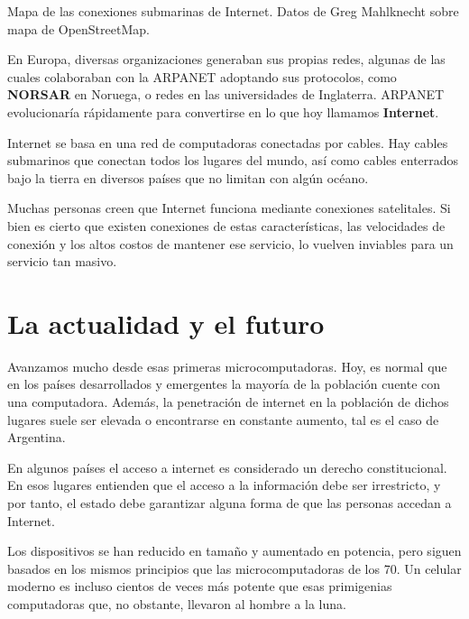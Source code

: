 {Mapa de las conexiones submarinas de Internet.} {Datos de Greg Mahlknecht sobre
mapa de OpenStreetMap.}

En Europa, diversas organizaciones generaban sus propias redes, algunas de las
cuales colaboraban con la ARPANET adoptando sus protocolos, como \textbf{NORSAR}
en Noruega, o redes en las universidades de Inglaterra. ARPANET evolucionaría
rápidamente para convertirse en lo que hoy llamamos
\textbf{Internet}.\autocite{hafner_1998}

\begin{knowwhat}
Internet se basa en una red de computadoras conectadas por cables. Hay cables
submarinos que conectan todos los lugares del mundo, así como cables enterrados
bajo la tierra en diversos países que no limitan con algún océano.

Muchas personas creen que Internet funciona mediante conexiones satelitales. Si
bien es cierto que existen conexiones de estas características, las velocidades
de conexión y los altos costos de mantener ese servicio, lo vuelven inviables
para un servicio tan masivo.
\end{knowwhat}

\section{La actualidad y el futuro}
\label{chap:historia_computadoras:sec:actualidad}

Avanzamos mucho desde esas primeras microcomputadoras. Hoy, es normal que en los
países desarrollados y emergentes la mayoría de la población cuente con una
computadora. Además, la penetración de internet en la población de dichos
lugares suele ser elevada o encontrarse en constante aumento, tal es el caso de
Argentina.

\begin{knowwhat}
En algunos países el acceso a internet es considerado un derecho constitucional.
En esos lugares entienden que el acceso a la información debe ser irrestricto, y
por tanto, el estado debe garantizar alguna forma de que las personas accedan a
Internet.
\end{knowwhat}

Los dispositivos se han reducido en tamaño y aumentado en potencia, pero siguen
basados en los mismos principios que las microcomputadoras de los 70. Un celular
moderno es incluso cientos de veces más potente que esas primigenias
computadoras que, no obstante, llevaron al hombre a la luna.

